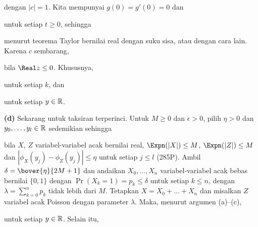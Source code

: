 {

\noindent dengan $|c|=1$. Kita mempunyai $g(0)=g'(0)=0$ dan


\noindent untuk setiap $t\ge 0$, sehingga


\noindent menurut teorema Taylor bernilai real dengan suku sisa, atau dengan
cara lain. Karena $c$ sembarang,


\noindent bila $\Real z\le 0$. Khususnya,


\noindent untuk setiap $k$, dan


\noindent untuk setiap $y\in\Bbb R$.

\medskip

{\bf (d)} Sekarang untuk taksiran terperinci. Untuk $M\ge 0$ dan
$\epsilon>0$, pilih $\eta>0$ dan $y_0,\ldots,y_l\in\Bbb R$ sedemikian sehingga


\noindent bila $X$, $Z$ variabel-variabel acak bernilai real,
$\Expn(|X|)\le M$, $\Expn(|Z|)\le M$ dan
$|\phi_X(y_j)-\phi_Z(y_j)|\le\eta$ untuk setiap $j\le l$ (285P). Ambil
$\delta=\bover{\eta}{2M+1}$
dan andaikan $X_0,\ldots,X_n$ variabel-variabel acak bebas bernilai
$\{0,1\}$ dengan $\Pr(X_k=1)=p_k\le\delta$ untuk setiap $k\le n$, dengan
$\lambda=\sum_{k=0}^np_k$ tidak lebih dari $M$. Tetapkan
$X=X_0+\ldots+X_n$
dan misalkan $Z$ variabel acak Poisson dengan parameter $\lambda$. Maka,
menurut argumen (a)--(c),


\noindent untuk setiap $y\in\Bbb R$. Selain itu,



}
